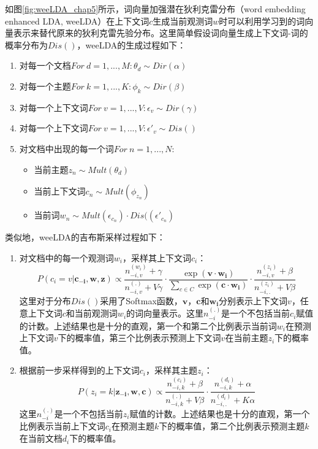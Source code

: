 \documentclass[master]{njuthesis}
\begin{document}
如图\ref{fig:weeLDA_chap5}所示，词向量加强潜在狄利克雷分布（word embedding enhanced LDA, weeLDA）在上下文词$c$生成当前观测词$w$时可以利用学习到的词向量表示来替代原来的狄利克雷先验分布。这里简单假设词向量生成上下文词-词的概率分布为$Dis()$，weeLDA的生成过程如下：
	\begin{enumerate}
	\item 对每一个文档$For\ d=1, ..., M: \theta_{d}\sim Dir(\alpha)$
	\item 对每一个主题$For\ k=1, ..., K: \phi_{k}\sim Dir(\beta)$
	\item 对每一个上下文词$For\ v=1, ..., V: \epsilon_{v}\sim Dir(\gamma)$
	\item 对每一个上下文词$For\ v=1, ..., V: \epsilon'_{v}\sim Dis()$
	\item 对文档中出现的每一个词$For\ n=1, ..., N:$
		\begin{itemize}
		\item 当前主题$z_{n}\sim Mult(\theta_{d})$
		\item 当前上下文词$c_{n}\sim Mult(\phi_{z_{n}})$
		\item 当前词$w_{n}\sim Mult(\epsilon_{c_{n}}) \cdot Dis((\epsilon'_{c_{n}})$
		\end{itemize}
	\end{enumerate}
	
类似地，weeLDA的吉布斯采样过程如下：
	\begin{enumerate}
	\item 	对文档中的每一个观测词$w_i$，采样其上下文词$c_i$：
			\begin{equation}\label{eq:caLDA_gb_c_chap5}
			P(c_i=v|\mathbf{c_{-i}, w, z})\propto \frac{n_{-i, v}^{(w_i)}+\gamma}{n_{-i, v}^{(.)}+V\gamma}\cdot \frac{\exp(\mathbf{v} \cdot \mathbf{w_{i}})}{\sum_{c\in C}\exp(\mathbf{c} \cdot \mathbf{w_{i}})} \cdot \frac{n_{-i, v}^{(z_i)}+\beta}{n_{-i, .}^{(z_i)}+V\beta}
			\end{equation}
			这里对于分布$Dis()$采用了Softmax函数，$\mathbf{v}$，$\mathbf{c}$和$\mathbf{w_i}$分别表示上下文词$v$，任意上下文词$c$和当前观测词$w_i$的词向量表示。这里$n_{-i}^{(.)}$是一个不包括当前$c_i$赋值的计数。上述结果也是十分的直观，第一个和第二个比例表示当前词$w_i$在预测上下文词$v$下的概率值，第三个比例表示预测上下文词$v$在当前主题$z_i$下的概率值。
	\item 	根据前一步采样得到的上下文词$c_i$，采样其主题$z_i$：
			\begin{equation}\label{eq:caLDA_gb_z_chap5}
			P(z_i=k|\mathbf{z_{-i}, w, c})\propto \frac{n_{-i, k}^{(c_i)}+\beta}{n_{-i, k}^{(.)}+V\beta}\cdot \frac{n_{-i, k}^{(d_i)}+\alpha}{n_{-i, .}^{(d_i)}+K\alpha}
			\end{equation}
			这里$n_{-i}^{(.)}$是一个不包括当前$z_i$赋值的计数。上述结果也是十分的直观，第一个比例表示当前上下文词$c_i$在预测主题$k$下的概率值，第二个比例表示预测主题$k$在当前文档$d_i$下的概率值。
	\end{enumerate}
	
\end{document}
